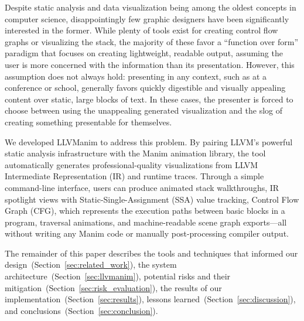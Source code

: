 Despite static analysis and data visualization being among the oldest concepts in computer science, disappointingly few graphic designers have been significantly interested in the former. While plenty of tools exist for creating control flow graphs or visualizing the stack, the majority of these favor a ``function over form'' paradigm that focuses on creating lightweight, readable output, assuming the user is more concerned with the information than its presentation. However, this assumption does not always hold: presenting in any context, such as at a conference or school, generally favors quickly digestible and visually appealing content over static, large blocks of text. In these cases, the presenter is forced to choose between using the unappealing generated visualization and the slog of creating something presentable for themselves.

We developed LLVManim to address this problem. By pairing LLVM's powerful static analysis infrastructure with the Manim animation library, the tool automatically generates professional-quality visualizations from LLVM Intermediate Representation (IR) and runtime traces. Through a simple command-line interface, users can produce animated stack walkthroughs, IR spotlight views with Static-Single-Assignment (SSA) value tracking, Control Flow Graph (CFG), which represents the execution paths between basic blocks in a program, traversal animations, and machine-readable scene graph exports---all without writing any Manim code or manually post-processing compiler output.

The remainder of this paper describes the tools and techniques that informed our design~(Section~\ref{sec:related_work}), the system architecture~(Section~\ref{sec:llvmanim}), potential risks and their mitigation~(Section~\ref{sec:risk_evaluation}), the results of our implementation~(Section~\ref{sec:results}), lessons learned~(Section~\ref{sec:discussion}), and conclusions~(Section~\ref{sec:conclusion}).
